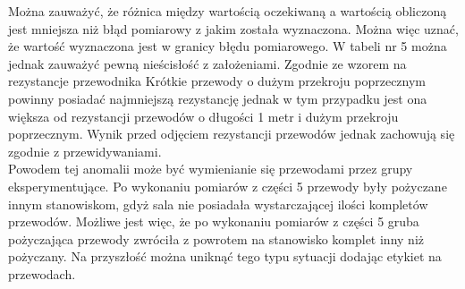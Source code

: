 \documentclass[11pt]{article}
\begin{document}
    \par Można zauważyć, że różnica między wartością oczekiwaną a wartością obliczoną jest mniejsza niż błąd pomiarowy z jakim
    została wyznaczona. Można więc uznać, że wartość wyznaczona jest w granicy błędu pomiarowego. W
    tabeli nr 5 można jednak zauważyć pewną nieścisłość z założeniami. Zgodnie ze wzorem na rezystancje przewodnika
    Krótkie przewody o dużym przekroju poprzecznym powinny posiadać najmniejszą rezystancję jednak w tym przypadku
    jest ona większa od rezystancji przewodów o długości 1 metr i dużym przekroju poprzecznym. Wynik przed odjęciem rezystancji
    przewodów jednak zachowują się zgodnie z przewidywaniami. \\
    \indent Powodem tej anomalii może być wymienianie się przewodami przez grupy
    eksperymentujące. Po wykonaniu pomiarów z części 5 przewody były pożyczane innym stanowiskom, gdyż sala nie posiadała wystarczającej ilości
    kompletów przewodów. Możliwe jest więc, że po wykonaniu pomiarów z części 5 gruba pożyczająca przewody zwróciła z powrotem na stanowisko komplet
    inny niż pożyczany. Na przyszłość można uniknąć tego typu sytuacji dodając etykiet na przewodach.\\
\end{document}
